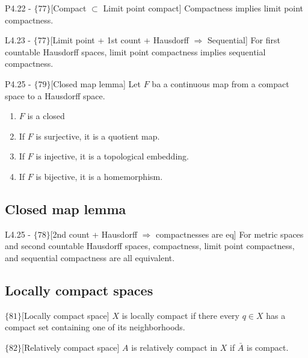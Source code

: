 \documentclass{article}
\begin{document}
\begin{flexilemma}{P4.22 - $\{77\}$}[Compact $\subset$ Limit point compact]
    Compactness implies limit point compactness.
\end{flexilemma}

\begin{flexilemma}{L4.23 - $\{77\}$}[Limit point + 1st count + Hausdorff $\Rightarrow$ Sequential]
    For first countable Hausdorff spaces, limit point compactness implies sequential compactness.
\end{flexilemma}

\begin{flexilemma}{P4.25 - $\{79\}$}[Closed map lemma]
   Let $F$ ba a continuous map from a compact space to a Hausdorff space.
   \begin{enumerate}[label = (\alph*)]
    \item $F$ is a closed
    \item If $F$ is surjective, it is a quotient map.
    \item If $F$ is injective, it is a topological embedding.
    \item If $F$ is bijective, it is a homemorphism.
   \end{enumerate}
\end{flexilemma}

\subsection{Closed map lemma}

\begin{flexilemma}{L4.25 - $\{78\}$}[2nd count + Hausdorff $\Rightarrow$ compactnesses are eq]
    For metric spaces and second countable Hausdorff spaces, compactness, limit point compactness, and sequential compactness are all equivalent.
\end{flexilemma}

\subsection{Locally compact spaces}

\begin{flexidefinition}{$\{81\}$}[Locally compact space]
    $X$ is locally compact if there every $q \in X$ has a compact set containing one of its neighborhoods.
\end{flexidefinition}

\begin{flexidefinition}{$\{82\}$}[Relatively compact space]
    $A$ is relatively compact in $X$ if $\bar A$ is compact.
\end{flexidefinition}
\end{document}
